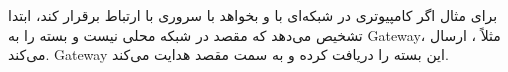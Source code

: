 برای مثال اگر کامپیوتری در شبکه‌ای با  و  بخواهد با سروری با  ارتباط برقرار کند، ابتدا تشخیص می‌دهد که مقصد در شبکه محلی نیست و بسته را به Gateway، مثلاً ، ارسال می‌کند. Gateway این بسته را دریافت کرده و به سمت مقصد هدایت می‌کند.

